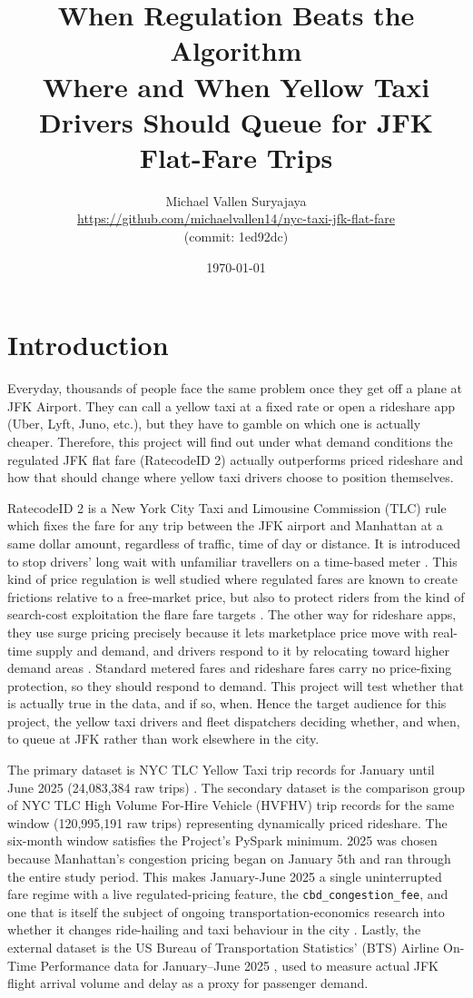 \documentclass[11pt]{article}
\title{\textbf{When Regulation Beats the Algorithm} \\ \large Where and When Yellow Taxi Drivers Should Queue for JFK Flat-Fare Trips}
\author{
Michael Vallen Suryajaya \\
{\small \url{https://github.com/michaelvallen14/nyc-taxi-jfk-flat-fare}} \\
\small (commit: 1ed92dc)
}
\date{\today}
\begin{document}
\maketitle

\section{Introduction}

Everyday, thousands of people face the same problem once they get off a plane at JFK
Airport. They can call a yellow taxi at a fixed rate or open a rideshare app (Uber,
Lyft, Juno, etc.), but they have to gamble on which one is actually cheaper.
Therefore, this project will find out under what demand conditions the regulated JFK
flat fare (RatecodeID 2) actually outperforms priced rideshare and how that should
change where yellow taxi drivers choose to position themselves.

RatecodeID 2 is a New York City Taxi and Limousine Commission (TLC) rule which fixes
the fare for any trip between the JFK airport and Manhattan at a same dollar amount,
regardless of traffic, time of day or distance. It is introduced to stop drivers' long
wait with unfamiliar travellers on a time-based meter \citep{tlc-fare-page}. This kind
of price regulation is well studied where regulated fares are known to create
frictions relative to a free-market price, but also to protect riders from the kind of
search-cost exploitation the flare fare targets \citep{frechette2019frictions}. The
other way for rideshare apps, they use surge pricing precisely because it lets
marketplace price move with real-time supply and demand, and drivers respond to it by
relocating toward higher demand areas \citep{garg2022driversurge}. Standard metered
fares and rideshare fares carry no price-fixing protection, so they should respond to
demand. This project will test whether that is actually true in the data, and if so,
when. Hence the target audience for this project, the yellow taxi drivers and fleet
dispatchers deciding whether, and when, to queue at JFK rather than work elsewhere in
the city.

The primary dataset is NYC TLC Yellow Taxi trip records for January until June 2025
(24,083,384 raw trips) \citep{tlc-trip-data}. The secondary dataset is the comparison
group of NYC TLC High Volume For-Hire Vehicle (HVFHV) trip records for the same window
(120,995,191 raw trips) representing dynamically priced rideshare. The six-month
window satisfies the Project's PySpark minimum. 2025 was chosen because Manhattan's
congestion pricing began on January 5th and ran through the entire study period. This
makes January-June 2025 a single uninterrupted fare regime with a live
regulated-pricing feature, the
\texttt{cbd\_congestion\_fee}, and one that is itself the subject of ongoing
transportation-economics research into whether it changes ride-hailing and taxi
behaviour in the city \citep{li2024congestionfees}. Lastly, the external dataset is
the US Bureau of Transportation Statistics' (BTS) Airline On-Time Performance data for
January--June 2025 \citep{bts-ontime}, used to measure actual JFK flight arrival
volume and delay as a proxy for passenger demand.
\end{document}
